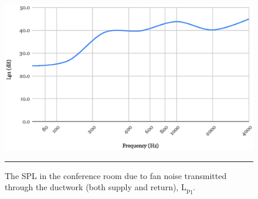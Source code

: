 \begin{figure}[htbp]
	\centering
	\includegraphics[width=\textwidth]{figures/Lp1.eps}
	\rule{\textwidth}{0.5pt} %
	\caption{The SPL in the conference room due to fan noise transmitted through the ductwork (both supply and return), L\textsubscript{p\textsubscript{1}}.}
	\label{fig:Lp1}
\end{figure}